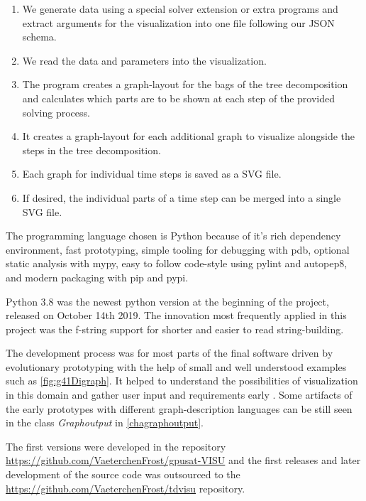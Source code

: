 \documentclass[a4paper, 12pt, bibliography=totoc]{scrartcl}
\begin{document}
\begin{enumerate}
	\item We generate data using a special solver extension or extra programs and extract arguments for the visualization into one file following our JSON schema.
	\item We read the data and parameters into the visualization.
	\item The program creates a graph-layout for the bags of the tree decomposition and calculates which parts are to be shown at each step of the provided solving process.
	\item It creates a graph-layout for each additional graph to visualize alongside the steps in the tree decomposition.
	\item Each graph for individual time steps is saved as a SVG file.
	\item If desired, the individual parts of a time step can be merged into a single SVG file.
\end{enumerate}

The programming language chosen is Python because of it's rich dependency environment, fast prototyping, simple tooling for debugging with pdb, optional static analysis with mypy, easy to follow code-style using pylint and autopep8, and modern packaging with pip and pypi.

Python 3.8 was the newest python version at the beginning of the project, released on October 14th 2019. The innovation most frequently applied in this project was the f-string support for shorter and easier to read string-building. %

The development process was for most parts of the final software driven by evolutionary prototyping with the help of small and well understood examples such as \ref{fig:g41Digraph}. It helped to understand the possibilities of visualization in this domain and gather user input and requirements early \cite{rapidPrototypingOvermyer}. Some artifacts of the early prototypes with different graph-description languages can be still seen in the class \textit{Graphoutput} in \ref{chagraphoutput}.

The first versions were developed in the repository \url{https://github.com/VaeterchenFrost/gpusat-VISU} and the first releases and later development of the source code was outsourced to the \url{https://github.com/VaeterchenFrost/tdvisu} repository.

\end{document}
